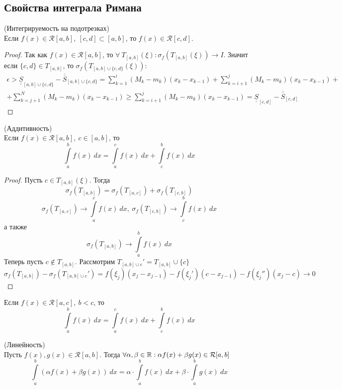 \subsection{Свойства интеграла Римана}
\begin{numtheorem} (Интегрируемость на подотрезках)\\
    Если $f(x)\in \mathcal{R}[a,b],\ [c,d]\subset [a,b]$, то $f(x)\in \mathcal{R}[c,d]$.
\end{numtheorem}
\begin{proof}
    Так как $f(x)\in \mathcal{R}[a,b]$, то $\forall\ T_{[a,b]}(\xi): \sigma_f(T_{[a,b]}(\xi))\to I$. Значит если $\{c,d\}\in T_{[a,b]}$, то $\sigma_f(T_{[a,b]\cup \{c,d\}}(\xi)):$
    \begin{multline*}
        \epsilon> \underline{\underline{S}}_{[a,b]\cup \{c,d\}}-\overline{\overline{S}}_{{[a,b]\cup \{c,d\}}}=\sum\limits_{k=1}^{i}(M_k-m_k)(x_k-x_{k-1})+\sum\limits_{k=i+1}^{j}(M_k-m_k)(x_k-x_{k-1})+\\
        +\sum\limits_{k=j+1}^{N}(M_k-m_k)(x_k-x_{k-1})\geq \sum\limits_{k=i+1}^{j}(M_k-m_k)(x_k-x_{k-1})=\underline{\underline{S}}_{[c,d]}-\overline{\overline{S}}_{[c,d]}
    \end{multline*}
\end{proof}
\begin{numtheorem} (Аддитивность)\\
    Если $f(x)\in \mathcal{R}[a,b],\ c\in [a,b]$, то 
    \[\int\limits_{a}^{b}f(x)\ dx=\int\limits_{a}^{c} f(x)\ dx+\int\limits_{c}^{b}f(x)\ dx\]
\end{numtheorem}
\begin{proof}
    Пусть $c\in T_{[a,b]}(\xi)$. Тогда
    \[\sigma_f(T_{[a,b]})=\sigma_f(T_{[a,c]})+\sigma_f(T_{[c,b]})\]
    \[\sigma_f(T_{[a,c]}) \to \int\limits_{a}^{c}f(x)\ dx,\ \sigma_f(T_{[c,b]})\to \int\limits_{c}^{b}f(x)\ dx\]
    а также
    \[\sigma_f(T_{[a,b]})\to \int\limits_{a}^{b}f(x)\ dx\]
    Теперь пусть $c\not\in T_{[a,b]}$. Рассмотрим $T_{[a,b]\cup c}'=T_{[a,b]}\cup \{c\}$
        \[\sigma_f(T_{[a,b]})-\sigma_f(T_{[a,b]\cup c}')=f(\xi_j)(x_j-x_{j-1})-f(\xi_j')(c-x_{j-1})-f(\xi_j'')(x_j-c)\to 0\]
\end{proof} 
\begin{comm}
    Если $f(x)\in \mathcal{R}[a,c],\ b<c$, то
    \[\int\limits_{a}^{b}f(x)\ dx=\int\limits_{a}^{c}f(x)\ dx+\int\limits_{c}^{b}f(x)\ dx\]
\end{comm} 
\begin{numtheorem} (Линейность)\\
    Пусть $f(x),g(x)\in \mathcal{R}[a,b]$. Тогда $\forall \alpha,\beta \in \mathbb{R}: \alpha f(x)+\beta g(x) \in \mathcal{R}[a,b]$
    \[\int\limits_{a}^{b}(\alpha f(x)+\beta g(x))\ dx=\alpha\cdot \int\limits_{a}^{b} f(x)\ dx+\beta\cdot \int\limits_{a}^{b}g(x)\ dx\]
\end{numtheorem}
